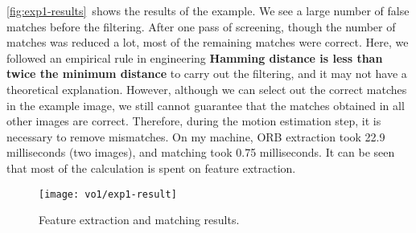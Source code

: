 \autoref{fig:exp1-results}~shows the results of the example. We see a large number of false matches before the filtering. After one pass of screening, though the number of matches was reduced a lot, most of the remaining matches were correct. Here, we followed an empirical rule in engineering \textbf{Hamming distance is less than twice the minimum distance} to carry out the filtering, and it may not have a theoretical explanation. However, although we can select out the correct matches in the example image, we still cannot guarantee that the matches obtained in all other images are correct. Therefore, during the motion estimation step, it is necessary to remove mismatches. On my machine, ORB extraction took 22.9 milliseconds (two images), and matching took 0.75 milliseconds. It can be seen that most of the calculation is spent on feature extraction.

\begin{figure}[!htp]
	\centering
	\texttt{[image: vo1/exp1-result]}
	\caption{Feature extraction and matching results.}
	\label{fig:exp1-results} 
\end{figure}


